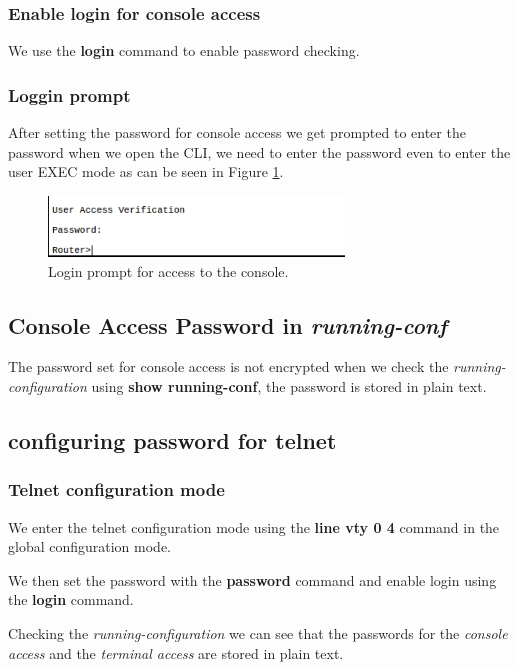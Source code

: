 \documentclass{article}
\begin{document}
\subsubsection{Enable login for console access}
We use the \textbf{login} command to enable password checking. 

\subsubsection{Loggin prompt}
After setting the password for console access we get prompted to enter the password when we open the CLI, we need to enter the password even to enter the user EXEC mode as can be seen in Figure \ref{fig:logincon}.

\begin{figure}[h]
    \centering
    \includegraphics[width=0.7\textwidth]{imgs/logincon}
    \caption{Login prompt for access to the console.}
    \label{fig:logincon}
\end{figure}

\subsection{Console Access Password in \emph{running-conf}}

The password set for console access is not encrypted when we check the \textit{running-configuration} using \textbf{show running-conf}, the password is stored in plain text. 

\subsection{configuring password for telnet}

\subsubsection{Telnet configuration mode}
We enter the telnet configuration mode using the \textbf{line vty 0 4} command in the global configuration mode.


We then set the password with the \textbf{password} command and enable login using the \textbf{login} command. 

Checking the \textit{running-configuration} we can see that the passwords for the \textit{console access} and the \textit{terminal access} are stored in plain text.
\end{document}
